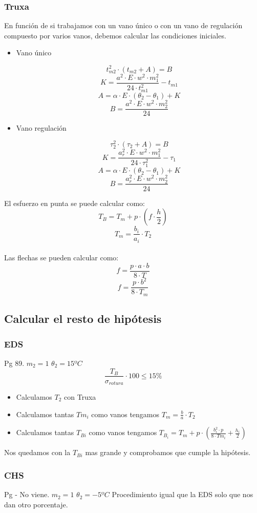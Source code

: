 \documentclass{article}
\begin{document}
\subsubsection{Truxa}
En función de si trabajamos con un vano único o con un vano de regulación compuesto por varios vanos, debemos calcular las condiciones iniciales.
\begin{itemize}
    \item Vano único
    
    $$t_{m 2}^{2} \cdot\left(t_{m 2}+A\right)=B$$
    $$K=\frac{a^{2} \cdot E \cdot w^{2} \cdot m_{1}^{2}}{24 \cdot t_{m 1}^{2}}-t_{m 1}$$
    $$A=\alpha \cdot E \cdot\left(\theta_{2}-\theta_{1}\right)+K$$
    $$B=\frac{a^{2} \cdot E \cdot w^{2} \cdot m_{2}^{2}}{24}$$
    \item Vano regulación
    
    $$\tau_2^{2} \cdot\left(\tau_2+A\right)=B$$
    $$K=\frac{a_{r}^{2} \cdot E \cdot w^{2} \cdot m_{1}^{2}}{24 \cdot \tau_{1}^{2}}-\tau_{1}$$
    $$A=\alpha \cdot E \cdot\left(\theta_{2}-\theta_{1}\right)+K$$
    $$B=\frac{a_{r}^{2} \cdot E \cdot w^{2} \cdot m_{2}^{2}}{24}$$
\end{itemize}
El esfuerzo en punta se puede calcular como:
$$T_{B}=T_{m}+p \cdot\left(f \cdot \frac{h}{2}\right)$$
$$T_m = \frac{b_i}{a_i} \cdot T_2$$
\\
Las flechas se pueden calcular como:
$$f=\frac{p \cdot a \cdot b}{8 \cdot T}$$
$$f=\frac{p \cdot b^{2}}{8 \cdot T_{m}}$$


\newpage
\subsection{Calcular el resto de hipótesis}
\subsubsection{EDS}
Pg 89. $m_2 = 1$ $\theta_2 = 15ºC$
$$\frac{T_B}{\sigma_{rotura}}\cdot 100 \leq 15\%$$
\begin{itemize}
    \item Calculamos $T_2$ con Truxa
    \item Calculamos tantas $Tm_i$ como vanos tengamos $T_m = \frac{b}{a}\cdot T_2$
    \item Calculamos tantas $T_{Bi}$ como vanos tengamos $T_B_i = T_m + p\cdot \left(\frac{b_i^2\cdot p}{8 \cdot Tm_i}+\frac{h_i}{2}\right)$
\end{itemize}
Nos quedamos con la $T_{Bi}$ mas grande y comprobamos que cumple la hipótesis.
\subsubsection{CHS}
Pg - No viene. $m_2 = 1$ $\theta_2 = -5ºC$
Procedimiento igual que la EDS solo que nos dan otro porcentaje.
\end{document}
